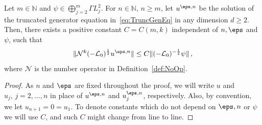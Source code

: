 \documentclass[reqno,11pt]{preprint}
\renewcommand{\N}{\mathbb{N}}
\newcommand{\cL}{\mathcal{L}}
\newcommand{\cN}{\mathcal{N}}
\newcommand{\1}{\mathds{1}}
\newcommand{\gensy}{\cL_0}
\begin{document}
\begin{proposition}\label{P:AprioriGeneratorEq}
Let $m\in\N$ and $\psi\in\bigoplus_{j=2}^m\Gamma L^2_j$. For $n\in\N$, $n\geq m$, let $u^{\eps,n}$ 
be the solution of the truncated generator equation in~\eqref{eq:TruncGenEq} in any dimension $d\geq 2$. 
Then, there exists a 
positive constant $C=C(m,k)$ independent of $n,\eps$ and $\psi$, such that
\begin{equation}\label{e:AprioriMain}
\|\mathcal N^k (-\gensy)^\frac12 u^{\eps,n}\|\leq C\|(-\gensy)^{-\frac12}\psi\|\,,
\end{equation}
where $\cN$ is the number operator in Definition~\ref{def:NoOp}. 
\end{proposition}
\begin{proof}
As $n$ and $\eps$ are fixed throughout the proof, we will write $u$ and $u_j,\,j=2,\dots,n$ in place of 
$u^{\eps,n}$ and $u^{\eps,n}_j$, respectively. 
Also, by convention, we let $u_{n+1}=0=u_1$. To denote constants which do not depend on $\eps,n$ or $\psi$ 
we will use $C$, and such $C$ might change from line to line. 
%


\end{proof}
\end{document}

